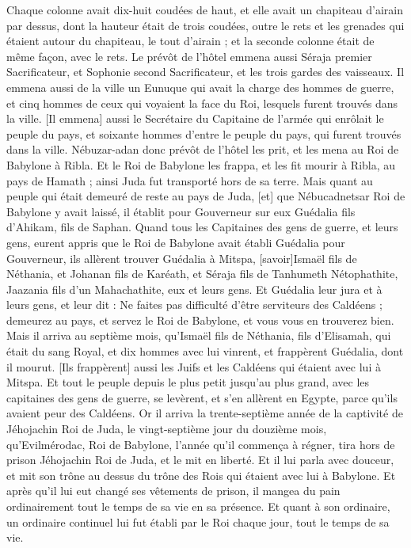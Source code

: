\begin{multicols}{2}
Chaque colonne avait dix-huit coudées de haut, et elle avait un chapiteau d'airain par dessus, dont la hauteur était de trois coudées, outre le rets et les grenades qui étaient autour du chapiteau, le tout d'airain ; et la seconde colonne était de même façon, avec le rets.
Le prévôt de l'hôtel emmena aussi Séraja premier Sacrificateur, et Sophonie second Sacrificateur, et les trois gardes des vaisseaux.
Il emmena aussi de la ville un Eunuque qui avait la charge des hommes de guerre, et cinq hommes de ceux qui voyaient la face du Roi, lesquels furent trouvés dans la ville. [Il emmena] aussi le Secrétaire du Capitaine de l'armée qui enrôlait le peuple du pays, et soixante hommes d'entre le peuple du pays, qui furent trouvés dans la ville.
Nébuzar-adan donc prévôt de l'hôtel les prit, et les mena au Roi de Babylone à Ribla.
Et le Roi de Babylone les frappa, et les fit mourir à Ribla, au pays de Hamath ; ainsi Juda fut transporté hors de sa terre.
Mais quant au peuple qui était demeuré de reste au pays de Juda, [et] que Nébucadnetsar Roi de Babylone y avait laissé, il établit pour Gouverneur sur eux Guédalia fils d'Ahikam, fils de Saphan.
Quand tous les Capitaines des gens de guerre, et leurs gens, eurent appris que le Roi de Babylone avait établi Guédalia pour Gouverneur, ils allèrent trouver Guédalia à Mitspa, [savoir]Ismaël fils de Néthania, et Johanan fils de Karéath, et Séraja fils de Tanhumeth Nétophathite, Jaazania fils d'un Mahachathite, eux et leurs gens.
Et Guédalia leur jura et à leurs gens, et leur dit : Ne faites pas difficulté d'être serviteurs des Caldéens ; demeurez au pays, et servez le Roi de Babylone, et vous vous en trouverez bien.
Mais il arriva au septième mois, qu'Ismaël fils de Néthania, fils d'Elisamah, qui était du sang Royal, et dix hommes avec lui vinrent, et frappèrent Guédalia, dont il mourut. [Ils frappèrent] aussi les Juifs et les Caldéens qui étaient avec lui à Mitspa.
Et tout le peuple depuis le plus petit jusqu'au plus grand, avec les capitaines des gens de guerre, se levèrent, et s'en allèrent en Egypte, parce qu'ils avaient peur des Caldéens.
Or il arriva la trente-septième année de la captivité de Jéhojachin Roi de Juda, le vingt-septième jour du douzième mois, qu'Evilmérodac, Roi de Babylone, l'année qu'il commença à régner, tira hors de prison Jéhojachin Roi de Juda, et le mit en liberté.
Et il lui parla avec douceur, et mit son trône au dessus du trône des Rois qui étaient avec lui à Babylone.
Et après qu'il lui eut changé ses vêtements de prison, il mangea du pain ordinairement tout le temps de sa vie en sa présence.
Et quant à son ordinaire, un ordinaire continuel lui fut établi par le Roi chaque jour, tout le temps de sa vie.
\PPE{}
\end{multicols}
